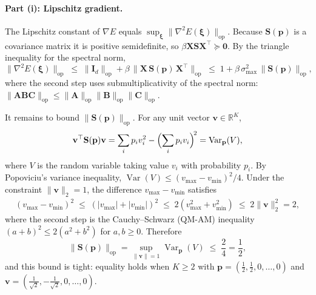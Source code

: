 \paragraph{Part (i): Lipschitz gradient.}
The Lipschitz constant of $\nabla E$ equals $\sup_{\boldsymbol{\xi}}\|\nabla^{2}E(\boldsymbol{\xi})\|_{\mathrm{op}}$. Because $\mathbf{S}(\mathbf{p})$ is a covariance matrix it is positive semidefinite, so $\beta\mathbf{X}\mathbf{S}\mathbf{X}^{\top}\succeq\mathbf{0}$. By the triangle inequality for the spectral norm,
\begin{equation}\label{eq:lip-triangle}
    \|\nabla^{2}E(\boldsymbol{\xi})\|_{\mathrm{op}}
    \;\le\; \|\mathbf{I}_{d}\|_{\mathrm{op}}
            + \beta\,\|\mathbf{X}\,\mathbf{S}(\mathbf{p})\,\mathbf{X}^{\top}\|_{\mathrm{op}}
    \;\le\; 1 + \beta\,\sigma_{\max}^{2}\,\|\mathbf{S}(\mathbf{p})\|_{\mathrm{op}},
\end{equation}
where the second step uses submultiplicativity of the spectral norm: $\|\mathbf{A}\mathbf{B}\mathbf{C}\|_{\mathrm{op}}\le\|\mathbf{A}\|_{\mathrm{op}}\|\mathbf{B}\|_{\mathrm{op}}\|\mathbf{C}\|_{\mathrm{op}}$.

It remains to bound $\|\mathbf{S}(\mathbf{p})\|_{\mathrm{op}}$. For any unit vector $\mathbf{v}\in\mathbb{R}^K$,
\begin{align*}
\mathbf{v}^{\top}\mathbf{S}(\mathbf{p})\mathbf{v}
= \sum_{i}p_{i}v_{i}^{2} - \Bigl(\sum_{i}p_{i}v_{i}\Bigr)^{\!2}
= \operatorname{Var}_{\mathbf{p}}(V),
\end{align*}
where $V$ is the random variable taking value $v_i$ with probability $p_i$. By Popoviciu's variance inequality, $\operatorname{Var}(V)\le(v_{\max}-v_{\min})^{2}/4$. Under the constraint $\|\mathbf{v}\|_{2}=1$, the difference $v_{\max}-v_{\min}$ satisfies
\begin{align*}
(v_{\max}-v_{\min})^{2}
\;\le\; (|v_{\max}|+|v_{\min}|)^{2}
\;\le\; 2(v_{\max}^{2}+v_{\min}^{2})
\;\le\; 2\|\mathbf{v}\|_{2}^{2} = 2,
\end{align*}
where the second step is the Cauchy--Schwarz (QM-AM) inequality $(a+b)^{2}\le 2(a^{2}+b^{2})$ for $a,b\ge 0$. Therefore
\begin{equation}\label{eq:softmax-spectral-bound}
    \|\mathbf{S}(\mathbf{p})\|_{\mathrm{op}}
    = \sup_{\|\mathbf{v}\|=1}\operatorname{Var}_{\mathbf{p}}(V)
    \;\le\; \frac{2}{4} = \frac{1}{2},
\end{equation}
and this bound is tight: equality holds when $K\ge 2$ with $\mathbf{p}=(\tfrac{1}{2},\tfrac{1}{2},0,\dots,0)$ and $\mathbf{v}=(\tfrac{1}{\sqrt{2}},-\tfrac{1}{\sqrt{2}},0,\dots,0)$.

